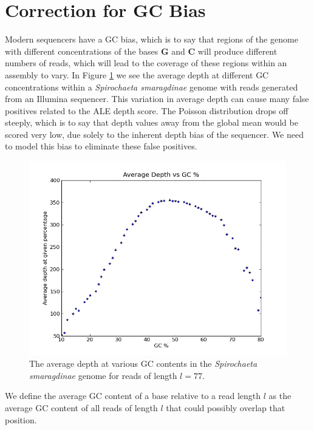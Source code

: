 \documentclass[phd,tocprelim]{cornell}
\begin{document}

\section{Correction for GC Bias} %
\label{sec:GCBias}

Modern sequencers have a GC bias, which is to say that regions of the genome with different concentrations of the bases {\bf G} and {\bf C} will produce different numbers of reads, which will lead to the coverage of these regions within an assembly to vary. In Figure \ref{fig:GC1} we see the average depth at different GC concentrations within a {\it Spirochaeta smaragdinae} genome with reads generated from an Illumina sequencer. This variation in average depth can cause many false positives related to the ALE depth score. The Poisson distribution drops off steeply, which is to say that depth values away from the global mean would be scored very low, due solely to the inherent depth bias of the sequencer. We need to model this bias to eliminate these false positives.

\begin{figure}[!tpb]%
    \centerline{\includegraphics[width=\textwidth]{figures/ALE/avgDepthVsGC.png}}
    \caption[Average depth vs. GC content]{The average depth at various GC contents in the {\it Spirochaeta smaragdinae} genome for reads of length $l = 77$.}\label{fig:GC1}
\end{figure}

We define the average GC content of a base relative to a read length $l$ as the average GC content of all reads of length $l$ that could possibly overlap that position.
\end{document}
